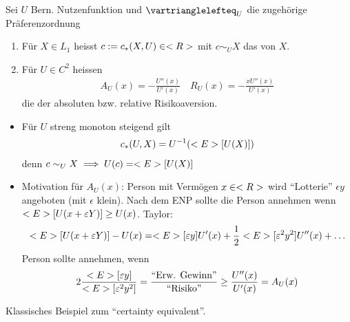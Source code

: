 \begin{definition}
	Sei $U$ Bern. Nutzenfunktion und $\vartrianglelefteq_U$ die zugehörige Präferenzordnung
	\begin{enumerate}
		\item Für $X \in L_1$ heisst $c:= c_{\ast}(X,U) \in <R>$ mit $c \sim_U X$ das  von $X$.
		\item Für $U \in C^2$ heissen
		\begin{align*}
			A_U(x) = - \frac{U''(x)}{U'(x)} \quad R_U(x) = -\frac{xU''(x)}{U'(x)}
		\end{align*}
		die  der absoluten bzw. relative Risikoaversion.
	\end{enumerate}
\end{definition}
\begin{*remark}
	\begin{itemize}
		\item Für $U$ streng monoton steigend gilt
		\begin{align*}
			c_{\ast}(U,X) = U^{-1}(<E>[U(X)])
		\end{align*}
		denn $c \sim_U X \implies U(c) = <E>[U(X)]$
		\item Motivation für $A_U(x)$: Person mit Vermögen $x \in <R>$ wird ``Lotterie'' $\epsilon y$ angeboten (mit $\epsilon$ klein). Nach dem ENP sollte die Person annehmen wenn $<E>[U(x+ \varepsilon Y)] \ge U(x)$. Taylor:
		\begin{align*}
			<E>[U(x+\varepsilon Y)] - U(x) = <E>[\varepsilon y]U'(x) + \frac12 <E>[\varepsilon^2 y^2]U''(x) + \dots
		\end{align*}
		Person sollte annehmen, wenn
		\begin{align*}
			2\frac{<E>[\varepsilon y]}{<E>[\varepsilon^2 y^2]} = \frac{\text{``Erw. Gewinn''}}{\text{``Risiko''}} \ge \frac{U''(x)}{U'(x)} = A_U(x)
		\end{align*}
		
	\end{itemize}
\end{*remark}
Klassisches Beispiel zum ``certainty equivalent''.
